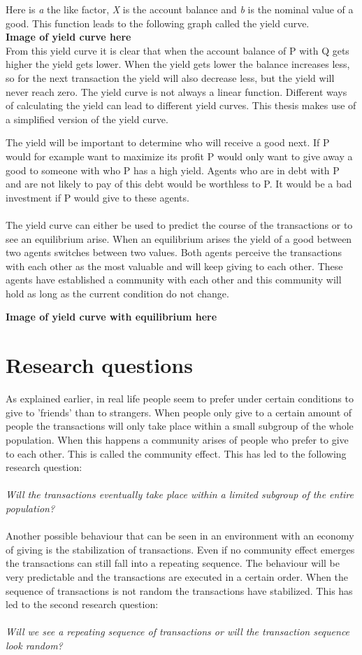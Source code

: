 \documentclass[twoside,openright]{uva-bachelor-thesis}
\begin{document}
Here is \textit{a} the like factor, \textit{X} is the account balance and \textit{b} is the nominal value of a good. This function leads to the following graph called the yield curve.
\\
\textbf{Image of yield curve here}
\\
From this yield curve it is clear that when the account balance of P with Q gets higher the yield gets lower.  When the yield gets lower the balance increases less, so for the next transaction the yield will also decrease less, but the yield will never reach zero.
The yield curve is not always a linear function. Different ways of calculating the yield can lead to different yield curves. This thesis makes use of a simplified version of the yield curve.

The yield will be important to determine who will receive a good next. If P would for example want to maximize its profit P would only want to give away a good to someone with who P has a high yield. Agents who are in debt with P and are not likely to pay of this debt would be worthless to P. It would be a bad investment if P would give to these agents.
\\
\\
The yield curve can either be used to predict the course of the transactions or to see an equilibrium arise. When an equilibrium arises the yield of a good between two agents switches between two values.  Both agents perceive the transactions with each other as the most valuable and will keep giving to each other. These agents have established a community with each other and this community will hold as long as the current condition do not change. 

\textbf{Image of yield curve with equilibrium here}

\section{Research questions}
As explained earlier, in real life people seem to prefer under certain conditions to give to 'friends' than to strangers. When people only give to a certain amount of people the transactions will only take place within a small subgroup of the whole population. When this happens a community arises of people who prefer to give to each other. This is called the community effect. This has led to the following research question:
\\
\\
\textit{Will the transactions eventually take place within a limited subgroup of the entire population?}
\\
\\
Another possible behaviour that can be seen in an environment with an economy of giving is the stabilization of transactions. Even if no community effect emerges the transactions can still fall into a repeating sequence. The behaviour will be very predictable and the transactions are executed in a certain order. When the sequence of transactions is not random the transactions have stabilized. This has led to the second research question:
\\
\\
\textit{Will we see a repeating sequence of transactions or will the transaction sequence look random?}
\end{document}
